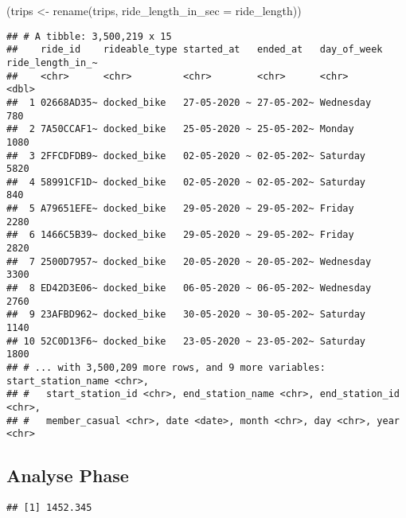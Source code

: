 \documentclass[
]{article}
\newenvironment{Shaded}{\begin{snugshade}}{\end{snugshade}}
\newcommand{\AttributeTok}[1]{\textcolor[rgb]{0.77,0.63,0.00}{#1}}
\newcommand{\FunctionTok}[1]{\textcolor[rgb]{0.00,0.00,0.00}{#1}}
\newcommand{\NormalTok}[1]{#1}
\newcommand{\OtherTok}[1]{\textcolor[rgb]{0.56,0.35,0.01}{#1}}
\newcommand{\SpecialCharTok}[1]{\textcolor[rgb]{0.00,0.00,0.00}{#1}}
\begin{document}
\begin{Shaded}
\begin{Highlighting}[]
\NormalTok{(trips }\OtherTok{\textless{}{-}} \FunctionTok{rename}\NormalTok{(trips,}
                 \AttributeTok{ride\_length\_in\_sec =}\NormalTok{ ride\_length))}
\end{Highlighting}
\end{Shaded}

\begin{verbatim}
## # A tibble: 3,500,219 x 15
##    ride_id    rideable_type started_at   ended_at   day_of_week ride_length_in_~
##    <chr>      <chr>         <chr>        <chr>      <chr>                  <dbl>
##  1 02668AD35~ docked_bike   27-05-2020 ~ 27-05-202~ Wednesday                780
##  2 7A50CCAF1~ docked_bike   25-05-2020 ~ 25-05-202~ Monday                  1080
##  3 2FFCDFDB9~ docked_bike   02-05-2020 ~ 02-05-202~ Saturday                5820
##  4 58991CF1D~ docked_bike   02-05-2020 ~ 02-05-202~ Saturday                 840
##  5 A79651EFE~ docked_bike   29-05-2020 ~ 29-05-202~ Friday                  2280
##  6 1466C5B39~ docked_bike   29-05-2020 ~ 29-05-202~ Friday                  2820
##  7 2500D7957~ docked_bike   20-05-2020 ~ 20-05-202~ Wednesday               3300
##  8 ED42D3E06~ docked_bike   06-05-2020 ~ 06-05-202~ Wednesday               2760
##  9 23AFBD962~ docked_bike   30-05-2020 ~ 30-05-202~ Saturday                1140
## 10 52C0D13F6~ docked_bike   23-05-2020 ~ 23-05-202~ Saturday                1800
## # ... with 3,500,209 more rows, and 9 more variables: start_station_name <chr>,
## #   start_station_id <chr>, end_station_name <chr>, end_station_id <chr>,
## #   member_casual <chr>, date <date>, month <chr>, day <chr>, year <chr>
\end{verbatim}

\hypertarget{analyse-phase}{%
\subsection{Analyse Phase}\label{analyse-phase}}

\begin{Shaded}
\end{Shaded}

\begin{verbatim}
## [1] 1452.345
\end{verbatim}
\end{document}
